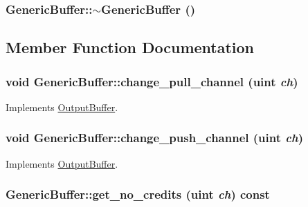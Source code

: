 \hypertarget{classGenericBuffer_d9a4c588a03bdf24a6fe586376d17e0c}{
\subsubsection[{$\sim$GenericBuffer}]{\setlength{\rightskip}{0pt plus 5cm}GenericBuffer::$\sim$GenericBuffer ()}}
\label{classGenericBuffer_d9a4c588a03bdf24a6fe586376d17e0c}




\subsection{Member Function Documentation}
\hypertarget{classGenericBuffer_6d7fe4a638dc7eb0358c3490bf8d2cf4}{
\subsubsection[{change\_\-pull\_\-channel}]{\setlength{\rightskip}{0pt plus 5cm}void GenericBuffer::change\_\-pull\_\-channel ({\bf uint} {\em ch})}}
\label{classGenericBuffer_6d7fe4a638dc7eb0358c3490bf8d2cf4}




Implements \hyperlink{classOutputBuffer_fb8e0a16f34dcff4c0d954201712f762}{OutputBuffer}.\hypertarget{classGenericBuffer_31e2c8b678d219fcc5d6e351f2f8623c}{
\subsubsection[{change\_\-push\_\-channel}]{\setlength{\rightskip}{0pt plus 5cm}void GenericBuffer::change\_\-push\_\-channel ({\bf uint} {\em ch})}}
\label{classGenericBuffer_31e2c8b678d219fcc5d6e351f2f8623c}




Implements \hyperlink{classOutputBuffer_45a685173b5c5cbe6270c9e0ce6d023a}{OutputBuffer}.\hypertarget{classGenericBuffer_8c80e28741bae248ed61c72cc5399f2d}{
\subsubsection[{get\_\-no\_\-credits}]{ GenericBuffer::get\_\-no\_\-credits ({\bf uint} {\em ch}) const}}
\label{classGenericBuffer_8c80e28741bae248ed61c72cc5399f2d}


